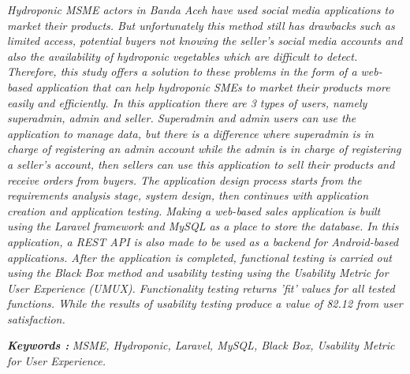 \begin{abstracteng}
\textit{Hydroponic MSME actors in Banda Aceh have used social media applications to market their products. But unfortunately this method still has drawbacks such as limited access, potential buyers not knowing the seller's social media accounts and also the availability of hydroponic vegetables which are difficult to detect. Therefore, this study offers a solution to these problems in the form of a web-based application that can help hydroponic SMEs to market their products more easily and efficiently. In this application there are 3 types of users, namely superadmin, admin and seller. Superadmin and admin users can use the application to manage data, but there is a difference where superadmin is in charge of registering an admin account while the admin is in charge of registering a seller's account, then sellers can use this application to sell their products and receive orders from buyers. The application design process starts from the requirements analysis stage, system design, then continues with application creation and application testing. Making a web-based sales application is built using the Laravel framework and MySQL as a place to store the database. In this application, a REST API is also made to be used as a backend for Android-based applications. After the application is completed, functional testing is carried out using the Black Box method and usability testing using the Usability Metric for User Experience (UMUX). Functionality testing returns 'fit' values for all tested functions. While the results of usability testing produce a value of 82.12 from user satisfaction.}

\bigskip
\noindent
\textbf{\emph{Keywords :}} \textit{MSME, Hydroponic, Laravel, MySQL, Black Box, Usability Metric for User Experience.}
\end{abstracteng}